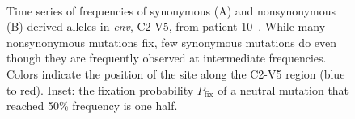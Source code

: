 \documentclass[rmp, twocolumn]{revtex4}
\newcommand{\pfix}{P_{\mathrm{fix}}}
\newcommand{\env}{\textit{env}}
\newcommand{\shankaregion}{C2-V5}
\begin{document}
\begin{figure}
\begin{center}
\\
\caption{Time series of frequencies
of synonymous (A) and nonsynonymous (B) derived alleles in \env, 
\shankaregion, from patient 10~\cite{shankarappa_consistent_1999}.
While many nonsynonymous mutations  fix, few synonymous
mutations do even though they are frequently observed at intermediate
frequencies. Colors indicate the position of the site along the \shankaregion{} region
(blue to red). Inset: the fixation probability $\pfix$ of a neutral
mutation that reached 50\% frequency is one half.}
\label{fig:aft}
\end{center}
\end{figure}
\end{document}
